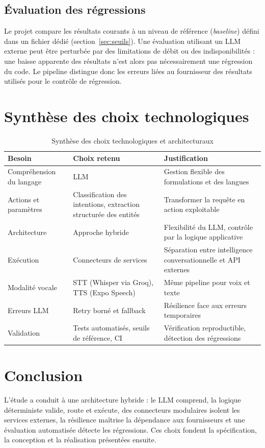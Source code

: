 \documentclass[11pt,a4paper,openany,oneside]{report}
\newcommand{\chapconcl}{\section*{Conclusion}\phantomsection\addcontentsline{toc}{section}{Conclusion}}
\begin{document}
\subsection{Évaluation des régressions}
Le projet compare les résultats courants à un niveau de référence (\emph{baseline}) défini dans un fichier dédié (section~\ref{sec:seuils}). Une évaluation utilisant un LLM externe peut être perturbée par des limitations de débit ou des indisponibilités : une baisse apparente des résultats n'est alors pas nécessairement une régression du code. Le pipeline distingue donc les erreurs liées au fournisseur des résultats utilisés pour le contrôle de régression.

\section{Synthèse des choix technologiques}
\begin{table}[htbp]
\centering\small
\caption{Synthèse des choix technologiques et architecturaux}\label{tab:synthese-choix}
\begin{tabularx}{\textwidth}{@{}p{3.7cm}p{3.7cm}X@{}}
\toprule
\textbf{Besoin} & \textbf{Choix retenu} & \textbf{Justification} \\
\midrule
Compréhension du langage & LLM & Gestion flexible des formulations et des langues \\
Actions et paramètres & Classification des intentions, extraction structurée des entités & Transformer la requête en action exploitable \\
Architecture & Approche hybride & Flexibilité du LLM, contrôle par la logique applicative \\
Exécution & Connecteurs de services & Séparation entre intelligence conversationnelle et API externes \\
Modalité vocale & STT (Whisper via Groq), TTS (Expo Speech) & Même pipeline pour voix et texte \\
Erreurs LLM & Retry borné et fallback & Résilience face aux erreurs temporaires \\
Validation & Tests automatisés, seuils de référence, CI & Vérification reproductible, détection des régressions \\
\bottomrule
\end{tabularx}
\end{table}

\chapconcl
L'étude a conduit à une architecture hybride : le LLM comprend, la logique déterministe valide, route et exécute, des connecteurs modulaires isolent les services externes, la résilience maîtrise la dépendance aux fournisseurs et une évaluation automatisée détecte les régressions. Ces choix fondent la spécification, la conception et la réalisation présentées ensuite.
\end{document}
